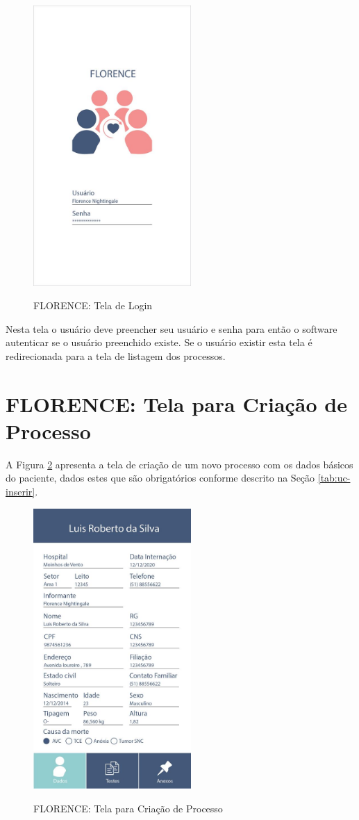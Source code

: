 \documentclass[portuguese,oneside]{tcc}
\begin{document}
\begin{figure}[htp]
\centering
\caption{FLORENCE: Tela de Login}
\includegraphics[width=6cm]{app-login}
\label{fig:app-login}
\end{figure}

Nesta tela o usuário deve preencher seu usuário e senha para então o software autenticar se o usuário preenchido existe. Se o usuário existir esta tela é redirecionada para a tela de listagem dos processos.  




\section{FLORENCE: Tela para Criação de Processo}
A Figura \ref{fig:app-criacao} apresenta a tela de criação de um novo processo com os dados básicos do paciente, dados estes que são obrigatórios conforme descrito na Seção \ref{tab:uc-inserir}.

\begin{figure}[htp]
\centering
\caption{FLORENCE: Tela para Criação de Processo}
\includegraphics[width=6cm]{app-data}
\label{fig:app-criacao}
\end{figure}
\end{document}
